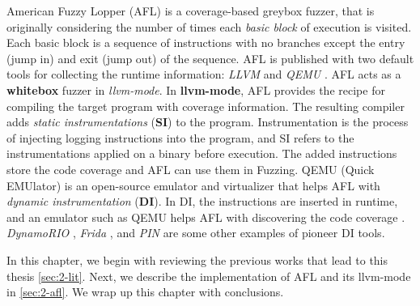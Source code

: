 American Fuzzy Lopper (AFL) \cite{afl_git} is a coverage-based greybox fuzzer, that is originally considering the number of times each \textit{basic block} of execution is visited. Each basic block is a sequence of instructions with no branches except the entry (jump in) and exit (jump out) of the sequence. AFL is published with two default tools for collecting the runtime information: \textit{LLVM} \cite{llvm} and \textit{QEMU} \cite{bellard2005qemu}.  AFL acts as a \textbf{whitebox} fuzzer in \textit{llvm-mode}. In \textbf{llvm-mode}, AFL provides the recipe for compiling the target program with coverage information. The resulting compiler adds \textit{static instrumentations} (\textbf{SI}) to the program. Instrumentation is the process of injecting logging instructions into the program, and SI refers to the instrumentations applied on a binary before execution. The added instructions store the code coverage and AFL can use them in Fuzzing. QEMU (Quick EMUlator) is an open-source emulator and virtualizer that helps AFL with \textit{dynamic instrumentation} (\textbf{DI}). In DI, the instructions are inserted in runtime, and an emulator such as QEMU helps AFL with discovering the code coverage \cite{afl_qemu}. \textit{DynamoRIO} \cite{dynamorio}, \textit{Frida} \cite{frida}, and \textit{PIN} \cite{pin} are some other examples of pioneer DI tools.

In this chapter, we begin with reviewing the previous works that lead to this thesis \ref{sec:2-lit}. Next, we describe the implementation of AFL and its llvm-mode in \ref{sec:2-afl}. We wrap up this chapter with conclusions.
